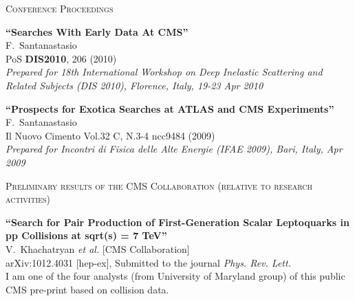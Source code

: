 \documentclass[10pt, a4paper]{article}
\begin{document}
\begin{thebibliography}{599}
\vspace{0.1cm} \begin{center} \textsc{Conference Proceedings} \end{center} \vspace{0.05cm}

{\bf ``Searches With Early Data At CMS''}
  \\{}F.~Santanastasio
  \\{}PoS {\bf DIS2010}, 206 (2010)
\\{}{\it Prepared for 18th International Workshop on Deep Inelastic Scattering and Related Subjects (DIS 2010), Florence, Italy, 19-23 Apr 2010}

{\bf ``Prospects for Exotica Searches at ATLAS and CMS Experiments''}
  \\{}F.~Santanastasio
  \\{}Il Nuovo Cimento Vol.32 C, N.3-4 ncc9484 (2009)
\\{}{\it Prepared for Incontri di Fisica delle Alte Energie (IFAE 2009), Bari, Italy, Apr 2009}

\vspace{0.1cm} \begin{center} \textsc{Preliminary results of the CMS Collaboration (relative to research activities)} \end{center} \vspace{0.05cm}

{\bf ``Search for Pair Production of First-Generation Scalar Leptoquarks in pp Collisions at sqrt(s) = 7 TeV''}
  \\{}V.~Khachatryan {\it et al.}  [CMS Collaboration]
  \\{}arXiv:1012.4031 [hep-ex], Submitted to the journal {\it Phys. Rev. Lett.}
  \\I am one of the four analysts (from University of Maryland group) of this public CMS pre-print based on collision data.


\end{thebibliography}
\end{document}
